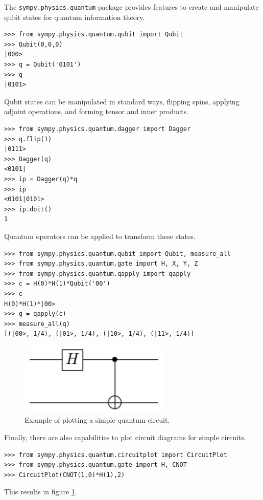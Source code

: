 The \verb|sympy.physics.quantum| package provides features to create and manipulate qubit states for quantum information theory. 
\begin{verbatim}
>>> from sympy.physics.quantum.qubit import Qubit
>>> Qubit(0,0,0)
|000>
>>> q = Qubit('0101')
>>> q
|0101>
\end{verbatim}
Qubit states can be manipulated in standard ways, flipping spins, applying adjoint operations, and forming tensor and inner products.
\begin{verbatim}
>>> from sympy.physics.quantum.dagger import Dagger
>>> q.flip(1)
|0111>
>>> Dagger(q)
<0101|
>>> ip = Dagger(q)*q
>>> ip
<0101|0101>
>>> ip.doit()
1
\end{verbatim}
Quantum operators can be applied to transform these states.
\begin{verbatim}
>>> from sympy.physics.quantum.qubit import Qubit, measure_all
>>> from sympy.physics.quantum.gate import H, X, Y, Z
>>> from sympy.physics.quantum.qapply import qapply
>>> c = H(0)*H(1)*Qubit('00')
>>> c
H(0)*H(1)*|00>
>>> q = qapply(c)
>>> measure_all(q)
[(|00>, 1/4), (|01>, 1/4), (|10>, 1/4), (|11>, 1/4)]
\end{verbatim}

\begin{figure}[htbp]
\begin{center}
\includegraphics[scale=0.5]{images/circuitplot-example.png}
\caption{Example of plotting a simple quantum circuit.}
\label{fig-circuitplot-example}
\end{center}
\end{figure}

Finally, there are also capabilities to plot circuit diagrams for simple circuits.
\begin{verbatim}
>>> from sympy.physics.quantum.circuitplot import CircuitPlot
>>> from sympy.physics.quantum.gate import H, CNOT
>>> CircuitPlot(CNOT(1,0)*H(1),2)
\end{verbatim}
This results in figure \ref{fig-circuitplot-example}.
